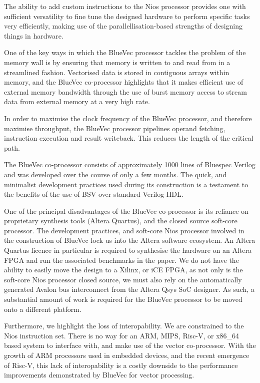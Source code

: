 \documentclass[a4paper,8pt]{report}
\begin{document}
The ability to add custom instructions to the Nios processor provides one with
sufficient versatility to fine tune the designed hardware to perform specific
tasks very efficiently, making use of the parallellisation-based strengths of
designing things in hardware.

One of the key ways in which the BlueVec processor tackles the problem of the
memory wall is by ensuring that memory is written to and read from in a
streamlined fashion. Vectorised data is stored in contiguous arrays within
memory, and the BlueVec co-processor highlights that it makes efficient use of
external memory bandwidth through the use of burst memory access to stream data
from external memory at a very high rate.


In order to maximise the clock frequency of the BlueVec processor, and therefore
maximise throughput, the BlueVec processor pipelines operand fetching,
instruction execution and result writeback. This reduces the length of the
critical path.

The BlueVec co-processor consists of approximately 1000 lines of Bluespec
Verilog and was developed over the course of only a few months. The quick, and
minimalist development practices used during its construction is a testament to
the benefits of the use of BSV over standard Verilog HDL.

One of the principal disadvantages of the BlueVec co-processor is its reliance
on proprietary synthesis tools (Altera Quartus), and the closed source soft-core
processor. The development practices, and soft-core Nios processor involved in
the construction of BlueVec lock us into the Altera software ecosystem. An
Altera Quartus licence in particular is required to synthesise the hardware on
an Altera FPGA and run the associated benchmarks in the paper. We do not have
the ability to easily move the design to a Xilinx, or iCE FPGA, as not only is
the soft-core Nios processor closed source, we must also rely on the
automatically generated Avalon bus interconnect from the Altera Qsys SoC
designer. As such, a substantial amount of work is required for the BlueVec
processor to be moved onto a different platform.


Furthermore, we highlight the loss of interopability. We are constrained to the
Nios instruction set. There is no way for an ARM, MIPS, Risc-V, or x86\_64 based
system to interface with, and make use of the vector co-processor. With the
growth of ARM processors used in embedded devices, and the recent emergence of
Risc-V, this lack of interopability is a costly downside to the performance
improvements demonstrated by BlueVec for vector processing.
\end{document}
